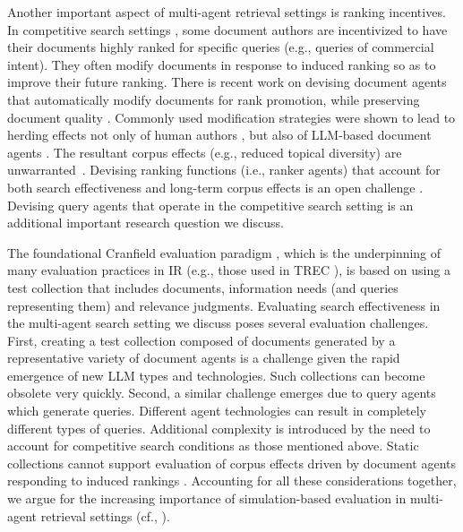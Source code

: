 Another important aspect of multi-agent retrieval settings is ranking incentives.
In competitive search
settings \cite{kurland_competitive_2022}, some document authors are
incentivized to have their documents highly ranked for specific
queries (e.g., queries of commercial intent). They often modify documents in response to induced ranking so as to improve their future ranking.
There is recent work on devising document agents that automatically modify documents
for rank promotion, while preserving document quality
\cite{Greg-bot,Niv}. Commonly used modification strategies were shown
to lead to herding effects not only of human authors
\cite{Nimrod,Greg-Herding}, but also of LLM-based document agents
\cite{Lemss}. The resultant corpus effects (e.g., reduced topical
diversity) are unwarranted~\cite{Nimrod}. Devising ranking functions (i.e., ranker
agents) that account for both search effectiveness and long-term
corpus effects is an open challenge
\cite{kurland_competitive_2022}. Devising query agents that operate in 
the competitive search setting is an additional important research
question we discuss.

The foundational Cranfield evaluation paradigm \cite{cranfield}, which
is the underpinning of many evaluation practices in IR (e.g., those
used in TREC \cite{Harman+Voorhees:06a}), is based on using a test
collection that includes documents, information needs (and queries
representing them) and relevance judgments. Evaluating search
effectiveness in the multi-agent search setting we discuss poses
several evaluation challenges. First, creating a test collection
composed of documents generated by a representative variety of
document agents is a challenge given the rapid emergence of new LLM
types and technologies. Such collections can become obsolete very
quickly. Second, a similar challenge emerges due to query
agents which generate queries. Different agent technologies can result
in completely different types of queries. Additional complexity is introduced by the need to account for
competitive search conditions \cite{kurland_competitive_2022} as those
mentioned above. Static collections cannot support evaluation of corpus effects driven by document agents responding to induced rankings \cite{kurland_competitive_2022}. Accounting for all these considerations together, we argue for the increasing importance of simulation-based evaluation in multi-agent retrieval settings (cf., \cite{Lemss}).

